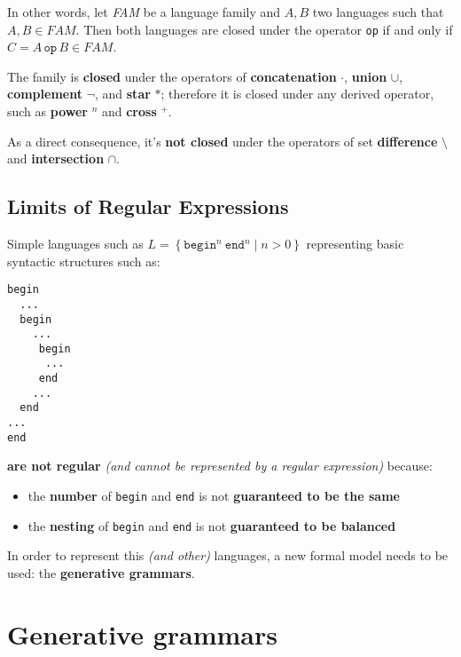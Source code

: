 \documentclass[english]{article}
\begin{document}
In other words, let \textit{FAM} be a language family and \(A, B\) two languages such that \(A, B \in FAM\).
Then both languages are closed under the operator \texttt{op} if and only if \(C = A \, \texttt{op} \, B \in FAM\).

\begin{definition}
  The family \REG is \textbf{closed} under the operators of \textbf{concatenation} \(\cdot\), \textbf{union} \(\cup\), \textbf{complement} \(\lnot\), and \textbf{star} \(\ast\);
  therefore it is closed under any derived operator, such as \textbf{power} \(^n\) and \textbf{cross} \(^+\).

  As a direct consequence, it's \textbf{not closed} under the operators of set \textbf{difference} \(\setminus\) and \textbf{intersection} \(\cap\).
\end{definition}

\subsection{Limits of Regular Expressions}

Simple languages such as \(L = \left\{ \texttt{begin}^n \ \texttt{end}^n \mid n > 0 \right\}\) representing basic syntactic structures such as:

\begin{verbatim}
begin
  ...
  begin
    ...
     begin
      ...
     end
    ...
  end
...
end
\end{verbatim}

\textbf{are not regular} \textit{(and cannot be represented by a regular expression)} because:

\begin{itemize}
  \item the \textbf{number} of \texttt{begin} and \texttt{end} is not \textbf{guaranteed to be the same}
  \item the \textbf{nesting} of \texttt{begin} and \texttt{end} is not \textbf{guaranteed to be balanced}
\end{itemize}

In order to represent this \textit{(and other)} languages, a new formal model needs to be used:
the \textbf{generative grammars}.

\clearpage

\section{Generative grammars}
\label{sec:generative-grammars}
\end{document}
